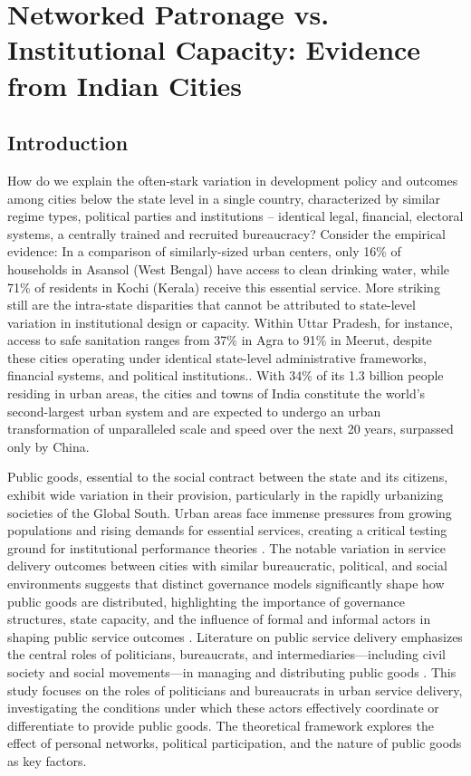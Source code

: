 \chapter{Networked Patronage vs. Institutional Capacity: Evidence from Indian Cities}

\section{Introduction}


How do we explain the often-stark variation in development policy and outcomes among cities below the state level in a single country, characterized by similar regime types, political parties and institutions -- identical legal, financial, electoral systems, a centrally trained and recruited bureaucracy? Consider the empirical evidence: In a comparison of similarly-sized urban centers, only 16\% of households in Asansol (West Bengal) have access to clean drinking water, while 71\% of residents in Kochi (Kerala) receive this essential service. More striking still are the intra-state disparities that cannot be attributed to state-level variation in institutional design or capacity. Within Uttar Pradesh, for instance, access to safe sanitation ranges from 37\% in Agra to 91\% in Meerut, despite these cities operating under identical state-level administrative frameworks, financial systems, and political institutions.\citep{census_of_india_2011_census_2011}. With 34\% of its 1.3 billion people residing in urban areas, the cities and towns of India constitute the world's second-largest urban system and are expected to undergo an urban transformation of unparalleled scale and speed over the next 20 years, surpassed only by China.

Public goods, essential to the social contract between the state and its citizens, exhibit wide variation in their provision, particularly in the rapidly urbanizing societies of the Global South. Urban areas face immense pressures from growing populations and rising demands for essential services, creating a critical testing ground for institutional performance theories \citep{heller_taking_2010, fukuyama_governance:_2016}. The notable variation in service delivery outcomes between cities with similar bureaucratic, political, and social environments suggests that distinct governance models significantly shape how public goods are distributed, highlighting the importance of governance structures, state capacity, and the influence of formal and informal actors in shaping public service outcomes \citep{evans_bureaucracy_1999}. Literature on public service delivery emphasizes the central roles of politicians, bureaucrats, and intermediaries—including civil society and social movements—in managing and distributing public goods \citep{batley_politics_2015}. This study focuses on the roles of politicians and bureaucrats in urban service delivery, investigating the conditions under which these actors effectively coordinate or differentiate to provide public goods. The theoretical framework explores the effect of personal networks, political participation, and the nature of public goods as key factors.

